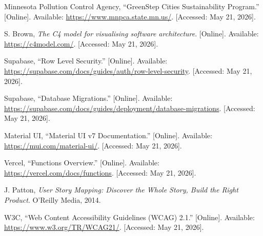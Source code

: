 \documentclass[11pt,letterpaper]{article}
\begin{document}
\begin{enumerate}[label={[\arabic*]}]
  \item Minnesota Pollution Control Agency, ``GreenStep Cities
        Sustainability Program.'' [Online]. Available:
        \url{https://www.mnpca.state.mn.us/}. [Accessed: May 21, 2026].
  \item S. Brown, \emph{The C4 model for visualising software
        architecture}. [Online]. Available:
        \url{https://c4model.com/}. [Accessed: May 21, 2026].
  \item Supabase, ``Row Level Security.'' [Online]. Available:
        \url{https://supabase.com/docs/guides/auth/row-level-security}.
        [Accessed: May 21, 2026].
  \item Supabase, ``Database Migrations.'' [Online]. Available:
        \url{https://supabase.com/docs/guides/deployment/database-migrations}.
        [Accessed: May 21, 2026].
  \item Material UI, ``Material UI v7 Documentation.'' [Online].
        Available: \url{https://mui.com/material-ui/}. [Accessed:
        May 21, 2026].
  \item Vercel, ``Functions Overview.'' [Online]. Available:
        \url{https://vercel.com/docs/functions}. [Accessed: May
        21, 2026].
  \item J. Patton, \emph{User Story Mapping: Discover the Whole
        Story, Build the Right Product}. O'Reilly Media, 2014.
  \item W3C, ``Web Content Accessibility Guidelines (WCAG) 2.1.''
        [Online]. Available: \url{https://www.w3.org/TR/WCAG21/}.
        [Accessed: May 21, 2026].
\end{enumerate}
\end{document}
